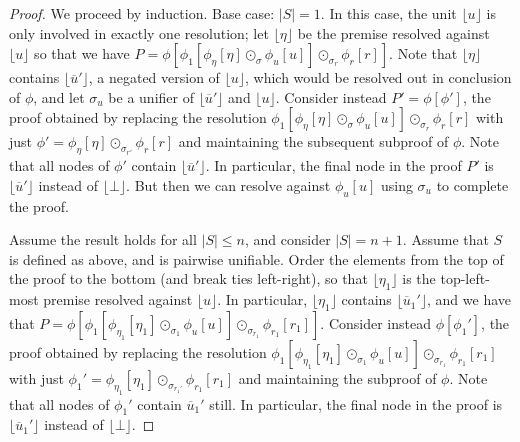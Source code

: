 \documentclass[12pt]{article}
\theoremstyle{definition}
\theoremstyle{remark}
\newcommand{\clause}[1]{ \lfloor{#1} \rfloor}
\begin{document}
\begin{proof}
We proceed by induction. Base case: $|S|=1$. In this case, the unit $\clause{u}$ is only involved in exactly one resolution; let $\clause{\eta}$ be the premise resolved against $\clause{u}$ so that we have $P=\phi[\phi_1[\phi_\eta[\eta] \odot_{\sigma} \phi_u[u]] \odot_{\sigma_r}  \phi_r[r]]$. Note that $\clause{\eta}$ contains $\clause{\overline{u}'}$, a negated version of $\clause{u}$, which would be resolved out in conclusion of $\phi$, and let $\sigma_u$ be a unifier of $\clause{\overline{u}'}$ and $\clause{u}$. Consider instead $P'=\phi[\phi']$, the proof obtained by replacing the resolution $\phi_1[\phi_\eta[\eta] \odot_{\sigma} \phi_u[u]] \odot_{\sigma_r}  \phi_r[r]$ with just $\phi' = \phi_\eta[\eta] \odot_{\sigma_{r'}} \phi_r[r]$ and maintaining the subsequent subproof of $\phi$. Note that all nodes of $\phi'$ contain $\clause{\overline{u}'}$. In particular, the final node in the proof $P'$ is $\clause{\overline{u}'}$ instead of $\clause{\bot}$. But then we can resolve against $\phi_u[u]$ using $\sigma_u$ to complete the proof.

Assume the result holds for all $|S|\le n$, and consider $|S|=n+1$. Assume that $S$ is defined as above, and is pairwise unifiable. Order the elements from the top of the proof to the bottom (and break ties left-right), so that $\clause{\eta_1}$ is the top-left-most premise resolved against $\clause{u}$. In particular, $\clause{\eta_1}$ contains $\clause{\overline{u}_1'}$, and we have that $P=\phi[\phi_1[\phi_{\eta_1}[\eta_1] \odot_{\sigma_1} \phi_u[u]] \odot_{\sigma_{r_1}} \phi_{r_1}[r_1]]$. Consider instead $\phi[\phi_1']$, the proof obtained by replacing the resolution $\phi_1[\phi_{\eta_1}[\eta_1] \odot_{\sigma_1} \phi_u[u]] \odot_{\sigma_{r_1}} \phi_{r_1}[r_1]$ with just $\phi_1' = \phi_{\eta_1}[\eta_1] \odot_{\sigma_{r_1'}} \phi_{r_1}[r_1]$ and maintaining the subproof of $\phi$. Note that all nodes of $\phi_1'$ contain $\overline{u}_1'$ still. In particular, the final node in the proof is $\clause{\overline{u}_1'}$ instead of $\clause{\bot}$.  


\end{proof}
\end{document}
